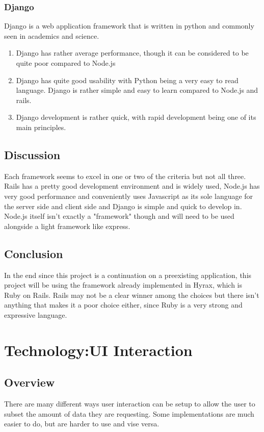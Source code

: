 \documentclass[onecolumn, draftclsnofoot,10pt, compsoc]{IEEEtran}
\begin{document}
\subsubsection{Django}
Django is a web application framework that is written in python and commonly seen in academics and science.
\begin{enumerate}
\item Django has rather average performance, though it can be considered to be quite poor compared to Node.js
\item Django has quite good usability with Python being a very easy to read language. Django is rather simple and easy to learn compared to Node.js and rails.
\item Django development is rather quick, with rapid development being one of its main principles.
\end{enumerate}

\subsection{Discussion}
Each framework seems to excel in one or two of the criteria but not all three. Rails has a pretty good development environment and is widely used, Node.js has very good performance and conveniently uses Javascript as its sole language for the server side and client side and Django is simple and quick to develop in. Node.js itself isn't exactly a "framework" though and will need to be used alongside a light framework like express.

\subsection{Conclusion}
In the end since this project is a continuation on a preexisting application, this project will be using the framework already implemented in Hyrax, which is Ruby on Rails. Rails may not be a clear winner among the choices but there isn't anything that makes it a poor choice either, since Ruby is a very strong and expressive language.

\section{Technology:UI Interaction}

\subsection{Overview}
 There are many different ways user interaction can be setup to allow the user to subset the amount of data they are requesting. Some implementations are much easier to do, but are harder to use and vise versa.
\end{document}

